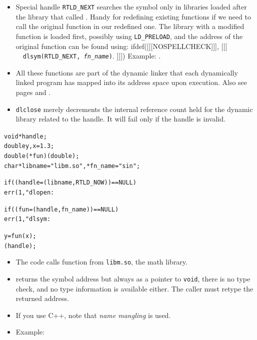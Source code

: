 \begin{itemize}
\begin{itemize}
    will be  made available for symbol resolution of subsequently loaded
    objects.  That is the default for objects mapped when executing a program.
    For , the default is \texttt{RTLD\_LOCAL}.  It means
    the same library can be mapped multiple times via  and the
    symbols in the mapped instances of the same library will not overlap.
    \end{itemize}
\item {} Special handle \texttt{RTLD\_NEXT} searches the symbol
only in libraries loaded after the library that called .  Handy for
redefining existing functions if we need to call the original function in our
redefined one.  The library with a modified function is loaded first, possibly
using \texttt{LD\_PRELOAD}, and the address of the original function can be
found using:
ifdef([[[NOSPELLCHECK]]], [[[
~~\texttt{dlsym(RTLD\_NEXT, \emph{fn\_name})}.
]]])
Example: .
\item  All these functions are part of the dynamic linker that each dynamically
linked program has mapped into its address space upon execution.  Also see pages
\pageref{RUNTIMELINKER} and \pageref{EXEC}.
\item \texttt{dlclose} merely decrements the internal reference count held for
the dynamic library related to the handle. It will fail only if the handle is
invalid.
\end{itemize}


\begin{slide}
\begin{alltt}
void *handle;
double y, x = 1.3;
double (*fun)(double);
char *libname = "libm.so", *fn\_name = "sin";

if ((handle = (libname, RTLD\_NOW)) == NULL)
        err(1, "dlopen: %

if ((fun = (handle, fn\_name)) == NULL)
        err(1, "dlsym: %

y = fun(x);
(handle);
\end{alltt}
\end{slide}

\begin{itemize}
\item The code calls function  from \texttt{libm.so}, the math
library.
\item {} returns the symbol address but always as a pointer to
\texttt{void}, there is no type check, and no type information is available
either.  The caller must retype the returned address.
\item If you use C++, note that \emph{name mangling} is used.
\item Example: 
\end{itemize}

\endinput
